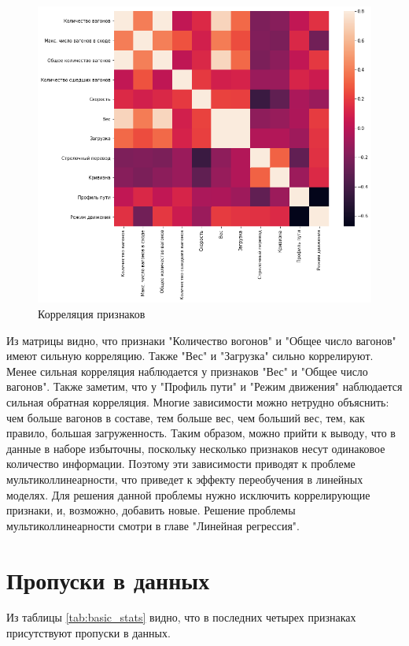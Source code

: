 \begin{figure}[H]
\begin{center}
\includegraphics[width=0.6\linewidth]{src/img/df_corr}
\caption{Корреляция признаков}
\label{fig:df_corr}
\end{center}
\end{figure}


Из матрицы видно, что признаки "Количество вогонов" и "Общее число вагонов" имеют сильную корреляцию. Также "Вес" и "Загрузка" сильно коррелируют. Менее сильная корреляция наблюдается у признаков "Вес" и "Общее число вагонов". Также заметим, что у "Профиль пути" и "Режим движения" наблюдается сильная обратная корреляция. Многие зависимости можно нетрудно объяснить: чем больше вагонов в составе, тем больше вес, чем больший вес, тем, как правило, большая загруженность. Таким образом, можно прийти к выводу, что в данные в наборе избыточны, поскольку несколько признаков несут одинаковое количество информации. Поэтому эти зависимости приводят к проблеме мультиколлинеарности, что приведет к эффекту переобучения в линейных моделях. Для решения данной проблемы нужно исключить коррелирующие признаки, и, возможно, добавить новые. Решение проблемы мультиколлинеарности смотри в главе "Линейная регрессия".

\section{Пропуски в данных}

Из таблицы \ref{tab:basic_stats} видно, что в последних четырех признаках присутствуют пропуски в данных.

